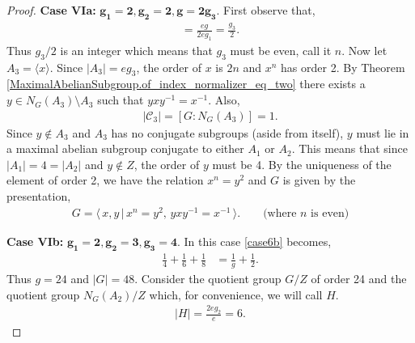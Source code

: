 \begin{proof}
 \space \textbf{Case VIa:} $\pmb{g_1 = 2, g_2 = 2, g=2 g_3}$. First observe that,
\begin{align*} [G : N_G(A_1)] = \frac{eg}{2eg_1} = \frac{g_3}{2}.
\end{align*}
Thus $g_3/2$ is an integer which means that $g_3$ must be even, call it $n$. Now let $A_3 = \langle x \rangle$. Since $|A_3| = eg_3$, the order of $x$ is $2n$ and $x^n$ has order 2. By Theorem \eqref{MaximalAbelianSubgroup.of_index_normalizer_eq_two} there exists a $y \in N_G(A_3) \! \setminus \! A_3$ such that $y x y^{-1} = x^{-1}$. Also,
\begin{align*} |\mathcal{C}_3| = [G : N_G(A_3)] = 1.
\end{align*}
Since $y \not \in A_3$ and $A_3$ has no conjugate subgroups (aside from itself), $y$ must lie in a maximal abelian subgroup conjugate to either $A_1$ or $A_2$. This means that since $|A_1| = 4 = |A_2|$ and $y \not \in Z$, the order of $y$ must be 4. By the uniqueness of the element of order 2, we have the relation $x^n = y^2$ and $G$ is given by the presentation,
\begin{align*} G = \langle \, x,y \, | \, x^n = y^2, \, yxy^{-1} = x^{-1} \, \rangle. \qquad \text{(where $n$ is even)}
\end{align*}

 \space \textbf{Case VIb:} $\pmb{g_1 = 2, g_2 = 3, g_3 = 4}$. In this case \eqref{case6b} becomes,
\begin{align*} \frac{1}{4} + \frac{1}{6} + \frac{1}{8} &= \frac{1}{g} + \frac{1}{2}.
\end{align*}
Thus $g = 24$ and $|G| = 48$. Consider the quotient group $G / Z$ of order 24 and the quotient group $N_G(A_2) / Z$ which, for convenience, we will call $H$.
\begin{align*} |H| = \frac{2eg_2}{e} = 6.
\end{align*}


\end{proof}
